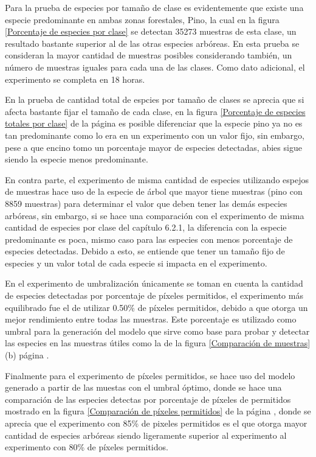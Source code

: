 Para la prueba de especies por tamaño de clase es evidentemente que existe una especie predominante en ambas zonas forestales, Pino, la cual en la figura \ref{Porcentaje de especies por clase} se detectan 35273 muestras de esta clase, un resultado bastante superior al de las otras especies arbóreas. En esta prueba se consideran la mayor cantidad de muestras posibles considerando también, un número de muestras iguales para cada una de las clases. Como dato adicional, el experimento se completa en 18 horas.

En la prueba de cantidad total de espcies por tamaño de clases se aprecia que si afecta bastante fijar el tamaño de cada clase, en la figura \ref{Porcentaje de especies totales por clase} de la página \pageref{Porcentaje de especies totales por clase} es posible diferenciar que la especie pino ya no es tan predominante como lo era en un experimento con un valor fijo, sin embargo, pese a que encino tomo un porcentaje mayor de especies detectadas, abies sigue siendo la especie menos predominante.

En contra parte, el experimento de misma cantidad de especies utilizando espejos de muestras hace uso de la especie de árbol que mayor tiene muestras (pino con 8859 muestras) para determinar el valor que deben tener las demás especies arbóreas, sin embargo, si se hace una comparación con el experimento de misma cantidad de especies por clase del capítulo 6.2.1, la diferencia con la especie predominante es poca, mismo caso para las especies con menos porcentaje de especies detectadas. Debido a esto, se entiende que tener un tamaño fijo de especies y un valor total de cada especie si impacta en el experimento.

En el experimento de umbralización únicamente se toman en cuenta la cantidad de especies detectadas por porcentaje de píxeles permitidos, el experimento más equilibrado fue el de utilizar 0.50\% de píxeles permitidos, debido a que otorga un mejor rendimiento entre todas las muestras. Este porcentaje es utilizado como umbral para la generación del modelo que sirve como base para probar y detectar las especies en las muestras útiles como la de la figura \ref{Comparación de muestras} (b) página \pageref{Comparación de muestras}.

Finalmente para el experimento de píxeles permitidos, se hace uso del modelo generado a partir de las muestas con el umbral óptimo, donde se hace una comparación de las especies detectas por porcentaje de píxeles de permitidos mostrado en la figura \ref{Comparación de píxeles permitidos} de la página \pageref{Comparación de píxeles permitidos}, donde se aprecia que el experimento con 85\% de pixeles permitidos es el que otorga mayor cantidad de especies arbóreas siendo ligeramente superior al experimento al experimento con 80\% de píxeles permitidos.

